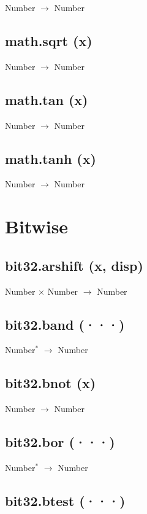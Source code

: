 \documentclass[12pt]{article}
\begin{document}
Number $\rightarrow$ Number

\subsection{math.sqrt (x)}

Number $\rightarrow$ Number

\subsection{math.tan (x)}

Number $\rightarrow$ Number

\subsection{math.tanh (x)}

Number $\rightarrow$ Number

\newpage

\section{Bitwise}

\subsection{bit32.arshift (x, disp)}

Number $\times$ Number $\rightarrow$ Number

\subsection{bit32.band (···)}

Number$^*$ $\rightarrow$ Number

\subsection{bit32.bnot (x)}

Number $\rightarrow$ Number

\subsection{bit32.bor (···)}

Number$^*$ $\rightarrow$ Number

\subsection{bit32.btest (···)}
\end{document}
